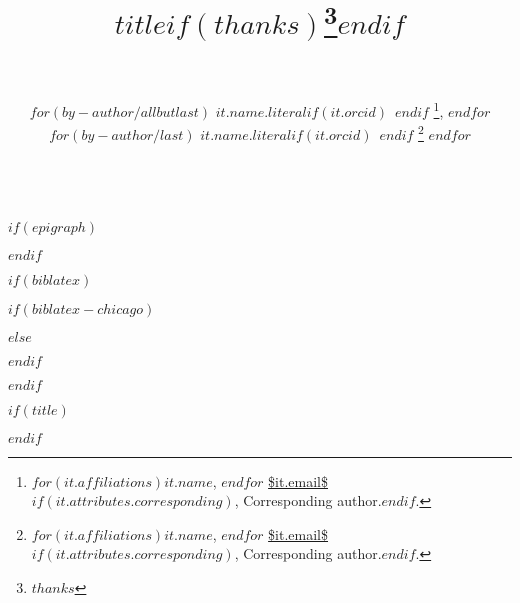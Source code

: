 
$if(epigraph)$
\usepackage{epigraph}
\renewcommand{\epigraphsize}{\footnotesize}
\setlength{\epigraphrule}{0em}
\setlength{\beforeepigraphskip}{-2em}
\setlength{\afterepigraphskip}{1em}
$endif$

$if(biblatex)$
\usepackage{csquotes}
$if(biblatex-chicago)$
\usepackage[$if(biblio-style)$$biblio-style$,$endif$$for(biblatexoptions)$$biblatexoptions$$sep$,$endfor$]{biblatex-chicago}
$else$
\usepackage[$if(biblio-style)$style=$biblio-style$,$endif$$for(biblatexoptions)$$biblatexoptions$$sep$,$endfor$]{biblatex}
$endif$

\setlength\bibitemsep{4pt}  %
\renewcommand*{\bibfont}{\normalsize} 
\setlength\bibhang{2em}  %



$endif$

\usepackage{orcidlink}  %

$if(title)$
\title{\MakeUppercase{$title$}$if(thanks)$\thanks{$thanks$}$endif$\\~}
$endif$


\author{
  $for(by-author/allbutlast)$
 $it.name.literal$$if(it.orcid)$~$endif$
 \thanks{$for(it.affiliations)$$it.name$, $endfor$%
{\footnotesize \url{$it.email$}}$if(it.attributes.corresponding)$, Corresponding author.$endif$.},
 $endfor$
 $for(by-author/last)$
 $it.name.literal$$if(it.orcid)$~$endif$
 \thanks{$for(it.affiliations)$$it.name$, $endfor$%
{\footnotesize \url{$it.email$}}$if(it.attributes.corresponding)$, Corresponding author.$endif$.}
 $endfor$
 \\~
 }

